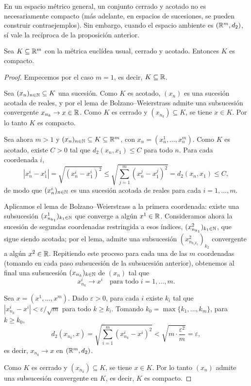 \begin{obs}
En un espacio métrico general, un conjunto cerrado y acotado no es
necesariamente compacto (más adelante, en espacios de sucesiones, se
pueden construir contraejemplos). Sin embargo, cuando el espacio ambiente
es $(\mathbb{R}^m,d_2)$, sí vale la recíproca de la proposición anterior.
\end{obs}

\begin{teo}
Sea $K \subseteq \mathbb{R}^m$ con la métrica euclídea usual, cerrado y acotado.
Entonces $K$ es compacto.
\end{teo}

\begin{proof}
Empecemos por el caso $m=1$, es decir, $K\subseteq \mathbb{R}$.

Sea $(x_n)_{n\in\mathbb{N}} \subseteq K$ una sucesión. Como $K$ es acotado,
$(x_n)$ es una sucesión acotada de reales, y por el lema de
Bolzano--Weierstrass admite una subsucesión convergente $x_{n_k}\to x \in
\mathbb{R}$. Como $K$ es cerrado y $(x_{n_k})\subseteq K$, se tiene $x\in K$. Por
lo tanto $K$ es compacto.

Sea ahora $m>1$ y $(x_n)_{n\in\mathbb{N}}\subseteq K \subseteq \mathbb{R}^m$, con
$x_n = (x_n^1,\dots,x_n^m)$. Como $K$ es acotado, existe $C>0$ tal que
$d_2(x_n,x_1)\le C$ para todo $n$. Para cada coordenada $i$,
\[
|x_n^i - x_1^i| = \sqrt{(x_n^i-x_1^i)^2} \le
\sqrt{\sum_{j=1}^m (x_n^j-x_1^j)^2} = d_2(x_n,x_1) \le C,
\]
de modo que $(x_n^i)_{n\in\mathbb{N}}$ es una sucesión acotada de reales para
cada $i=1,\dots,m$.

Aplicamos el lema de Bolzano--Weierstrass a la primera coordenada: existe
una subsucesión $(x_{n_{k_1}}^1)_{k_1\in\mathbb{N}}$ que converge a algún $x^1 \in
\mathbb{R}$. Consideramos ahora la sucesión de segundas coordenadas restringida a
esos índices, $(x_{n_{k_1}}^2)_{k_1\in\mathbb{N}}$, que sigue siendo acotada; por
el lema, admite una subsucesión $(x_{n_{k_1 k_2}}^2)_{k_2}$ convergente a
algún $x^2\in\mathbb{R}$. Repitiendo este proceso para cada una de las $m$
coordenadas (tomando en cada paso subsucesión de la subsucesión
anterior), obtenemos al final una subsucesión $(x_{n_k})_{k\in\mathbb{N}}$ de
$(x_n)$ tal que
\[
x_{n_k}^i \to x^i \quad \text{para todo } i=1,\dots,m.
\]

Sea $x=(x^1,\dots,x^m)$. Dado $\varepsilon>0$, para cada $i$ existe $k_i$
tal que $|x_{n_k}^i - x^i| < \varepsilon/\sqrt{m}$ para todo $k\ge k_i$.
Tomando $k_0 = \max\{k_1,\dots,k_m\}$, para $k\ge k_0$,
\[
d_2(x_{n_k},x) = \sqrt{\sum_{i=1}^m (x_{n_k}^i-x^i)^2}
< \sqrt{m \cdot \frac{\varepsilon^2}{m}} = \varepsilon,
\]
es decir, $x_{n_k}\to x$ en $(\mathbb{R}^m,d_2)$.

Como $K$ es cerrado y $(x_{n_k})\subseteq K$, se tiene $x\in K$. Por lo
tanto $(x_n)$ admite una subsucesión convergente en $K$, es decir, $K$ es
compacto.
\end{proof}

